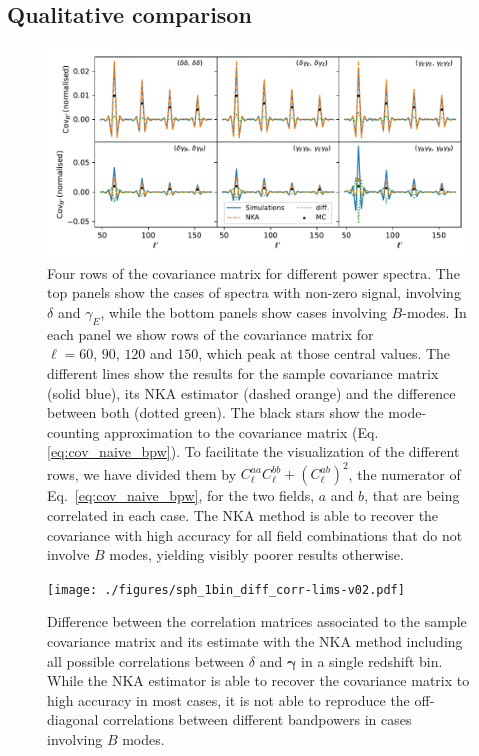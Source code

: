 \documentclass[a4paper,11pt]{article}
\begin{document}
    \subsection{Qualitative comparison}\label{ssec:results.visual}
      \begin{figure}
        \centering
        \includegraphics[width=\textwidth]{./figures/all_rows_sph_1bin.pdf}
        \caption{Four rows of the covariance matrix for different power spectra. The top panels show the cases of spectra with non-zero signal, involving $\delta$ and $\gamma_E$, while the bottom panels show cases involving $B$-modes. In each panel we show rows of the covariance matrix for $\ell=60,\,90,\,120$ and $150$, which peak at those central values. The different lines show the results for the sample covariance matrix (solid blue), its NKA estimator (dashed orange) and the difference between both (dotted green). The black stars show the mode-counting approximation to the covariance matrix (Eq. \ref{eq:cov_naive_bpw}). To facilitate the visualization of the different rows, we have divided them by $C_\ell^{aa}C_\ell^{bb}+(C^{ab}_\ell)^2$, the numerator of Eq.~\ref{eq:cov_naive_bpw}, for the two fields, $a$ and $b$, that are being correlated in each case. The NKA method is able to recover the covariance with high accuracy for all field combinations that do not involve $B$ modes, yielding visibly poorer results otherwise.}
        \label{fig:rows_1bin}
      \end{figure}
      \begin{figure}
        \centering
        \texttt{[image: ./figures/sph\_1bin\_diff\_corr-lims-v02.pdf]}
        \caption{Difference between the correlation matrices associated to the sample covariance matrix and its estimate with the NKA method including all possible correlations between $\delta$ and $\boldsymbol{\gamma}$ in a single redshift bin. While the NKA estimator is able to recover the covariance matrix to high accuracy in most cases, it is not able to reproduce the off-diagonal correlations between different bandpowers in cases involving $B$ modes.} \label{fig:diff_corr_1bin}
      \end{figure}
\end{document}
